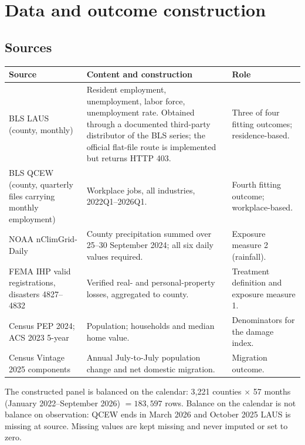 \documentclass[11pt,a4paper]{article}
\begin{document}
\section{Data and outcome construction}

\subsection{Sources}
\begin{center}\small
\begin{tabular}{>{\raggedright}p{3.1cm}>{\raggedright}p{7.2cm}>{\raggedright\arraybackslash}p{4.9cm}}
\toprule
Source & Content and construction & Role \\
\midrule
BLS LAUS (county, monthly) & Resident employment, unemployment, labor force, unemployment rate. Obtained through a documented third-party distributor of the BLS series; the official flat-file route is implemented but returns HTTP 403. & Three of four fitting outcomes; residence-based.\\
BLS QCEW (county, quarterly files carrying monthly employment) & Workplace jobs, all industries, 2022Q1--2026Q1. & Fourth fitting outcome; workplace-based.\\
NOAA nClimGrid-Daily & County precipitation summed over 25--30 September 2024; all six daily values required. & Exposure measure 2 (rainfall).\\
FEMA IHP valid registrations, disasters 4827--4832 & Verified real- and personal-property losses, aggregated to county. & Treatment definition and exposure measure 1.\\
Census PEP 2024; ACS 2023 5-year & Population; households and median home value. & Denominators for the damage index.\\
Census Vintage 2025 components & Annual July-to-July population change and net domestic migration. & Migration outcome.\\
\bottomrule
\end{tabular}
\end{center}

The constructed panel is balanced on the calendar: 3{,}221 counties $\times$ 57 months (January
2022--September 2026) $=183{,}597$ rows. Balance on the calendar is not balance on observation:
QCEW ends in March 2026 and October 2025 LAUS is missing at source. Missing values are kept missing
and never imputed or set to zero.
\end{document}
